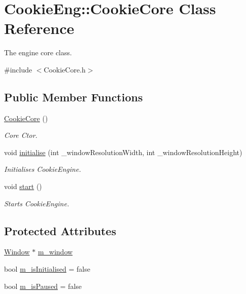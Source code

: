 \hypertarget{class_cookie_eng_1_1_cookie_core}{}\section{Cookie\+Eng\+:\+:Cookie\+Core Class Reference}
\label{class_cookie_eng_1_1_cookie_core}


The engine core class.  




{\ttfamily \#include $<$Cookie\+Core.\+h$>$}

\subsection*{Public Member Functions}
\begin{DoxyCompactItemize}
\item 
\hyperlink{class_cookie_eng_1_1_cookie_core_a4eca2aeec2dc76b06646bd5124de3d98}{Cookie\+Core} ()
\begin{DoxyCompactList}\small\item\em Core Ctor. \end{DoxyCompactList}\item 
void \hyperlink{class_cookie_eng_1_1_cookie_core_ac3921a88393cf927bce932958ba710b6}{initialise} (int \+\_\+window\+Resolution\+Width, int \+\_\+window\+Resolution\+Height)
\begin{DoxyCompactList}\small\item\em Initialises Cookie\+Engine. \end{DoxyCompactList}\item 
void \hyperlink{class_cookie_eng_1_1_cookie_core_a30f6d3ab2c753095de7d61c69dddbd87}{start} ()
\begin{DoxyCompactList}\small\item\em Starts Cookie\+Engine. \end{DoxyCompactList}\end{DoxyCompactItemize}
\subsection*{Protected Attributes}
\begin{DoxyCompactItemize}
\item 
\hyperlink{class_cookie_eng_1_1_window}{Window} $\ast$ \hyperlink{class_cookie_eng_1_1_cookie_core_ab95ee714d9d00c4a43859d0e427ea577}{m\+\_\+window}
\item 
bool \hyperlink{class_cookie_eng_1_1_cookie_core_a56072701bf07b2f787081cf41f5ae254}{m\+\_\+is\+Initialised} = false
\item 
bool \hyperlink{class_cookie_eng_1_1_cookie_core_ab2ee013f3abf0fae40a416aac7b942d0}{m\+\_\+is\+Paused} = false
\end{DoxyCompactItemize}


